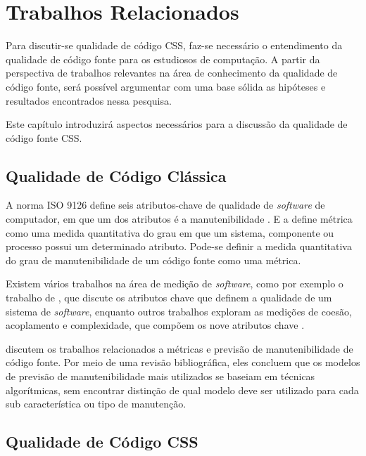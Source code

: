 %
%

\chapter{Trabalhos Relacionados}

Para discutir-se qualidade de código CSS, faz-se necessário o entendimento da qualidade de código fonte para os estudiosos de computação. 
A partir da perspectiva de trabalhos relevantes na área de conhecimento da qualidade de código fonte, será possível argumentar com uma base sólida as hipóteses e resultados encontrados nessa pesquisa.

Este capítulo introduzirá aspectos necessários para a discussão da qualidade de código fonte CSS.

\section{Qualidade de Código Clássica}

A norma ISO 9126 define seis atributos-chave de qualidade de \textit{software} de computador, em que um dos atributos é a manutenibilidade \cite{Pressman:2010}. E a  define métrica como uma medida quantitativa do grau em que um sistema, componente ou processo possui um determinado atributo. Pode-se definir a medida quantitativa do grau de manutenibilidade de um código fonte como uma métrica.

Existem vários trabalhos na área de medição de \textit{software}, como por exemplo o trabalho de , que discute os atributos chave que definem a qualidade de um sistema de \textit{software}, enquanto outros trabalhos exploram as medições de coesão, acoplamento e complexidade, que compõem os nove atributos chave \cite{McCabe:1989,Zuse:1991,Bieman1994,Dhama:1995,Zuse:1997} .

 discutem os trabalhos relacionados a métricas e previsão de manutenibilidade de código fonte. Por meio de uma revisão bibliográfica, eles concluem que os modelos de previsão de manutenibilidade mais utilizados se baseiam em técnicas algorítmicas, sem encontrar distinção de qual modelo deve ser utilizado para cada sub característica ou tipo de manutenção.

\section{Qualidade de Código CSS}

